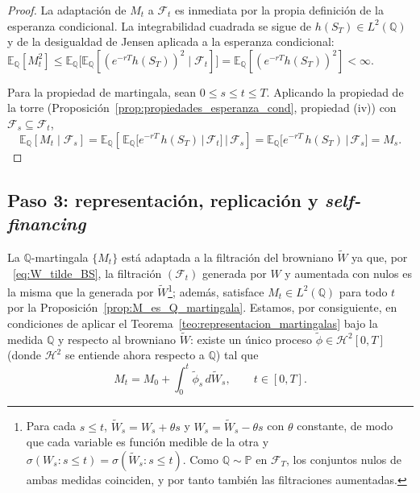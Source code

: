 \documentclass[11pt,a4paper,oneside]{report}
\theoremstyle{plain}
\theoremstyle{definition}
\theoremstyle{remark}
\newcommand{\E}{\mathbb{E}}
\newcommand{\PP}{\mathbb{P}}
\newcommand{\Q}{\mathbb{Q}}
\newcommand{\F}{\mathcal{F}}
\newcommand{\1}{\mathbf{1}}
\begin{document}
\begin{proof}
La adaptación de $M_t$ a $\F_t$ es inmediata por la propia definición
de la esperanza condicional. La integrabilidad cuadrada se sigue de
$h(S_T) \in L^2(\Q)$ y de la desigualdad de Jensen aplicada a la
esperanza condicional: $\E_\Q[M_t^2] \leq \E_\Q\bigl[
\E_\Q[(e^{-rT} h(S_T))^2 \mid \F_t]\bigr] = \E_\Q[(e^{-rT} h(S_T))^2]
< \infty$.

Para la propiedad de martingala, sean $0 \leq s \leq t \leq T$.
Aplicando la propiedad de la torre
(Proposición~\ref{prop:propiedades_esperanza_cond}, propiedad (iv))
con $\F_s \subseteq \F_t$,
\begin{equation*}
  \E_\Q[M_t \mid \F_s]
  = \E_\Q\!\left[\,\E_\Q\bigl[e^{-rT}\, h(S_T) \,\big|\, \F_t\bigr]
                 \,\Big|\, \F_s\right]
  = \E_\Q\!\bigl[e^{-rT}\, h(S_T) \,\big|\, \F_s\bigr]
  = M_s.
\end{equation*}
\end{proof}

\subsection{Paso 3: representación, replicación y \emph{self-financing}}
\label{subsec:paso3_replicacion}

La
$\Q$-martingala $\{M_t\}$ está adaptada a la filtración del browniano
$\widetilde W$ ya que, por ~\eqref{eq:W_tilde_BS}, la filtración $(\F_t)$ generada por $W$ y aumentada con nulos es la misma que la generada por $\widetilde W$\footnote{Para cada $s \le t$, $\widetilde W_s = W_s + \theta s$ y $W_s = \widetilde W_s - \theta s$ con $\theta$ constante, de modo que cada variable es función medible de la otra y $\sigma(W_s : s \le t) = \sigma(\widetilde W_s : s \le t)$. Como $\Q \sim \PP$ en $\F_T$, los conjuntos nulos de ambas medidas coinciden, y por tanto también las filtraciones aumentadas.}; además, satisface $M_t \in L^2(\Q)$ para todo $t$ por la
Proposición~\ref{prop:M_es_Q_martingala}. Estamos, por consiguiente,
en condiciones de aplicar el
Teorema~\ref{teo:representacion_martingalas} bajo la medida $\Q$ y
respecto al browniano $\widetilde W$: existe un único proceso
$\widetilde\phi \in \mathcal{H}^2[0, T]$ (donde $\mathcal{H}^2$ se
entiende ahora respecto a $\Q$) tal que
\begin{equation}\label{eq:representacion_M}
  M_t = M_0 + \int_0^t \widetilde\phi_s\, d\widetilde W_s,
  \qquad t \in [0, T].
\end{equation}
\end{document}
